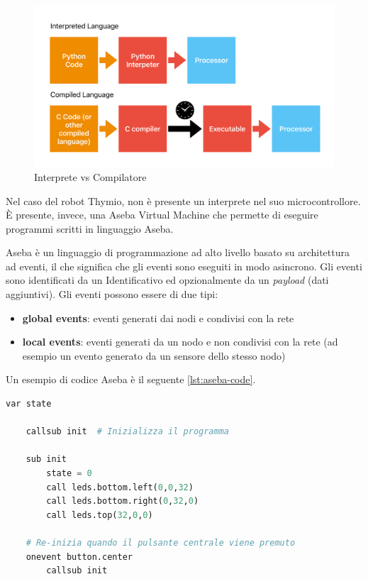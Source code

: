 \documentclass[12pt,a4paper,openright,twoside]{book}
\begin{document}
\begin{figure}
    \centering
    \includegraphics[width=.8\linewidth]{figures/interpreter-compiler.pdf}
    \caption{Interprete vs Compilatore}
    \label{fig:interpreter-vs-compiler}
\end{figure}

Nel caso del robot Thymio, non è presente un interprete nel suo microcontrollore. È presente, invece, una Aseba Virtual Machine che permette di eseguire programmi scritti in linguaggio Aseba. 

Aseba è un linguaggio di programmazione ad alto livello basato su architettura ad eventi, il che significa che gli eventi sono eseguiti in modo asincrono. Gli eventi sono identificati da un Identificativo ed opzionalmente da un \textit{payload} (dati aggiuntivi). 
Gli eventi possono essere di due tipi:
\begin{itemize}
    \item \textbf{global events}: eventi generati dai nodi e condivisi con la rete
    \item \textbf{local events}: eventi generati da un nodo e non condivisi con la rete (ad esempio un evento generato da un sensore dello stesso nodo)
\end{itemize}

Un esempio di codice Aseba è il seguente \cref{lst:aseba-code}.
\begin{lstlisting}[language=Python, label={lst:aseba-code}, caption={Esempio di codice Aseba con eventi}]
    var state

    callsub init  # Inizializza il programma

    sub init
        state = 0
        call leds.bottom.left(0,0,32)
        call leds.bottom.right(0,32,0)
        call leds.top(32,0,0)

    # Re-inizia quando il pulsante centrale viene premuto
    onevent button.center
        callsub init
\end{lstlisting}
\end{document}
